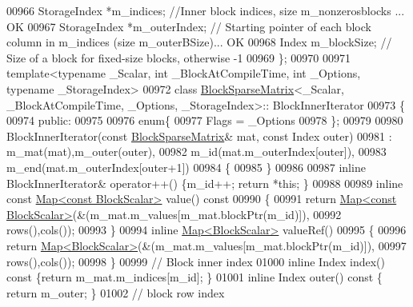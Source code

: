 \begin{DoxyCode}
00966     StorageIndex *m\_indices; \textcolor{comment}{//Inner block indices, size m\_nonzerosblocks ... OK}
00967     StorageIndex *m\_outerIndex; \textcolor{comment}{// Starting pointer of each block column in m\_indices (size
       m\_outerBSize)... OK}
00968     Index m\_blockSize; \textcolor{comment}{// Size of a block for fixed-size blocks, otherwise -1}
00969 \};
00970 
00971 \textcolor{keyword}{template}<\textcolor{keyword}{typename} \_Scalar, \textcolor{keywordtype}{int} \_BlockAtCompileTime, \textcolor{keywordtype}{int} \_Options, \textcolor{keyword}{typename} \_StorageIndex>
00972 \textcolor{keyword}{class }\hyperlink{group___sparse_core___module_class_eigen_1_1_block_sparse_matrix}{BlockSparseMatrix}<\_Scalar, \_BlockAtCompileTime, \_Options, \_StorageIndex>::
      BlockInnerIterator
00973 \{
00974   \textcolor{keyword}{public}:
00975 
00976     \textcolor{keyword}{enum}\{
00977       Flags = \_Options
00978     \};
00979 
00980     BlockInnerIterator(\textcolor{keyword}{const} \hyperlink{group___sparse_core___module_class_eigen_1_1_block_sparse_matrix}{BlockSparseMatrix}& mat, \textcolor{keyword}{const} Index outer)
00981     : m\_mat(mat),m\_outer(outer),
00982       m\_id(mat.m\_outerIndex[outer]),
00983       m\_end(mat.m\_outerIndex[outer+1])
00984     \{
00985     \}
00986 
00987     \textcolor{keyword}{inline} BlockInnerIterator& operator++() \{m\_id++; \textcolor{keywordflow}{return} *\textcolor{keyword}{this}; \}
00988 
00989     \textcolor{keyword}{inline} \textcolor{keyword}{const} \hyperlink{group___core___module_class_eigen_1_1_map}{Map<const BlockScalar>} value()\textcolor{keyword}{ const}
00990 \textcolor{keyword}{    }\{
00991       \textcolor{keywordflow}{return} \hyperlink{group___core___module_class_eigen_1_1_map}{Map<const BlockScalar>}(&(m\_mat.m\_values[m\_mat.blockPtr(m\_id)]),
00992           rows(),cols());
00993     \}
00994     \textcolor{keyword}{inline} \hyperlink{group___core___module_class_eigen_1_1_map}{Map<BlockScalar>} valueRef()
00995     \{
00996       \textcolor{keywordflow}{return} \hyperlink{group___core___module_class_eigen_1_1_map}{Map<BlockScalar>}(&(m\_mat.m\_values[m\_mat.blockPtr(m\_id)]),
00997           rows(),cols());
00998     \}
00999     \textcolor{comment}{// Block inner index}
01000     \textcolor{keyword}{inline} Index index()\textcolor{keyword}{ const }\{\textcolor{keywordflow}{return} m\_mat.m\_indices[m\_id]; \}
01001     \textcolor{keyword}{inline} Index outer()\textcolor{keyword}{ const }\{ \textcolor{keywordflow}{return} m\_outer; \}
01002     \textcolor{comment}{// block row index}

\end{DoxyCode}
